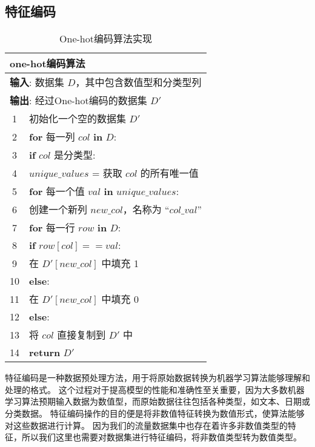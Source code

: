 \subsection{特征编码}
\begin{table}[htbp]
  \caption{One-hot编码算法实现}
  \label{tab:onehot}
  \centering
  \begin{tabularx}{1.0\textwidth}{cl}
  \toprule
  \multicolumn{2}{l}{\textbf{one-hot编码算法}}\\
  \midrule
  \multicolumn{2}{l}{\textbf{输入}: 数据集 $D$，其中包含数值型和分类型列} \\ 
  \multicolumn{2}{l}{\textbf{输出}: 经过One-hot编码的数据集 $D'$} \\
  1& 初始化一个空的数据集 $D'$ \\
  2& \textbf{for} 每一列 $col$ \textbf{in} $D$: \\
  3&\quad \textbf{if} $col$ 是分类型: \\
  4&\quad\quad $unique\_values$ = 获取 $col$ 的所有唯一值 \\
  5&\quad\quad \textbf{for} 每一个值 $val$ \textbf{in} $unique\_values$: \\
  6&\quad\quad\quad 创建一个新列 $new\_col$，名称为 ``$col\_val$''\\
  7&\quad\quad\quad \textbf{for} 每一行 $row$ \textbf{in} $D$: \\
  8&\quad\quad\quad\quad \textbf{if} $row[col] == val$: \\
  9&\quad\quad\quad\quad\quad 在 $D'[new\_col]$ 中填充 1 \\
  10&\quad\quad\quad\quad \textbf{else}: \\
  11&\quad\quad\quad\quad\quad 在 $D'[new\_col]$ 中填充 0 \\
  12&\quad \textbf{else}: \\
  13&\quad\quad 将 $col$ 直接复制到 $D'$ 中 \\
  14&\textbf{return} $D'$ \\ 
  \bottomrule
  \end{tabularx}
  \end{table}
特征编码是一种数据预处理方法，用于将原始数据转换为机器学习算法能够理解和处理的格式。
这个过程对于提高模型的性能和准确性至关重要，因为大多数机器学习算法预期输入数据为数值型，而原始数据往往包括各种类型，如文本、日期或分类数据。
特征编码操作的目的便是将非数值特征转换为数值形式，使算法能够对这些数据进行计算。
因为我们的流量数据集中也存在着许多非数值类型的特征，所以我们这里也需要对数据集进行特征编码，将非数值类型转为数值类型。\par

